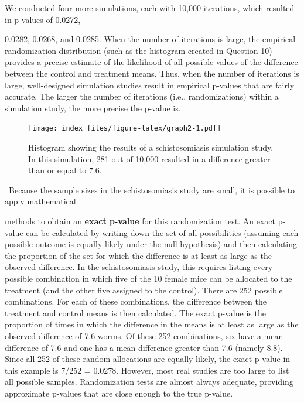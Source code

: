 \documentclass[
]{report}
\begin{document}
We conducted four more simulations, each with 10,000 iterations, which resulted in p-values of 0.0272,

0.0282, 0.0268, and 0.0285. When the number of iterations is large, the empirical randomization distribution
(such as the histogram created in Question 10) provides a precise estimate of the likelihood of all possible values of the difference between the control and treatment means. Thus, when the number of iterations is large,
well-designed simulation studies result in empirical p-values that are fairly accurate. The larger the number
of iterations (i.e., randomizations) within a simulation study, the more precise the p-value is.

\begin{figure}
\centering
\texttt{[image: index\_files/figure-latex/graph2-1.pdf]}
\caption{\label{fig:graph2}Histogram showing the results of a schistosomiasis simulation study. In this simulation, 281 out of 10,000 resulted in a difference greater than or equal to 7.6.}
\end{figure}

~Because the sample sizes in the schistosomiasis study are small, it is possible to apply mathematical

methods to obtain an \textbf{exact p-value} for this randomization test. An exact p-value can be calculated by writing
down the set of all possibilities (assuming each possible outcome is equally likely under the null hypothesis)
and then calculating the proportion of the set for which the difference is at least as large as the observed difference.
In the schistosomiasis study, this requires listing every possible combination in which five of the 10
female mice can be allocated to the treatment (and the other five assigned to the control). There are 252 possible
combinations. For each of these combinations, the difference between the treatment and control means
is then calculated. The exact p-value is the proportion of times in which the difference in the means is at least
as large as the observed difference of 7.6 worms. Of these 252 combinations, six have a mean difference of
7.6 and one has a mean difference greater than 7.6 (namely 8.8). Since all 252 of these random allocations are
equally likely, the exact p-value in this example is 7/252 = 0.0278. However, most real studies are too large
to list all possible samples. Randomization tests are almost always adequate, providing approximate p-values
that are close enough to the true p-value.

\large
\end{document}
